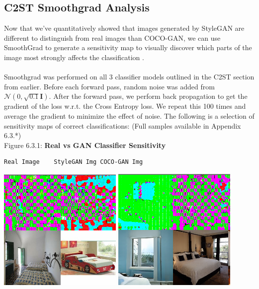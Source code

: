 \documentclass[10pt]{article}
\begin{document}
\begin{multicols*}{2}
        \subsection{C2ST Smoothgrad Analysis}
        Now that we've quantitatively showed that images generated by StyleGAN are different to distinguish from real images than COCO-GAN, we can use SmoothGrad to generate a sensitivity map to visually discover which parts of the image most strongly affects the classification \cite{smoothgrad}.
        \\\\
        Smoothgrad was performed on all 3 classifier models outlined in the C2ST section from earlier.
        Before each forward pass, random noise was added from $\mathcal{N}(0, \sqrt{0.1}\mathbf{I})$.
        After the forward pass, we perform back propagation to get the gradient of the loss w.r.t. the Cross Entropy loss.
        We repeat this 100 times and average the gradient to minimize the effect of noise.
        The following is a selection of sensitivity maps of correct classifications: (Full samples available in Appendix 6.3.*)\\
        Figure 6.3.1: \textbf{Real vs GAN Classifier Sensitivity}
        \begin{verbatim}Real Image    StyleGAN Img COCO-GAN Img\end{verbatim}
        \includegraphics[scale=0.3]{smoothgrad/combined/real.png}
        \includegraphics[scale=0.3]{smoothgrad/combined/stylegan.png}

\end{multicols*}
\end{document}
